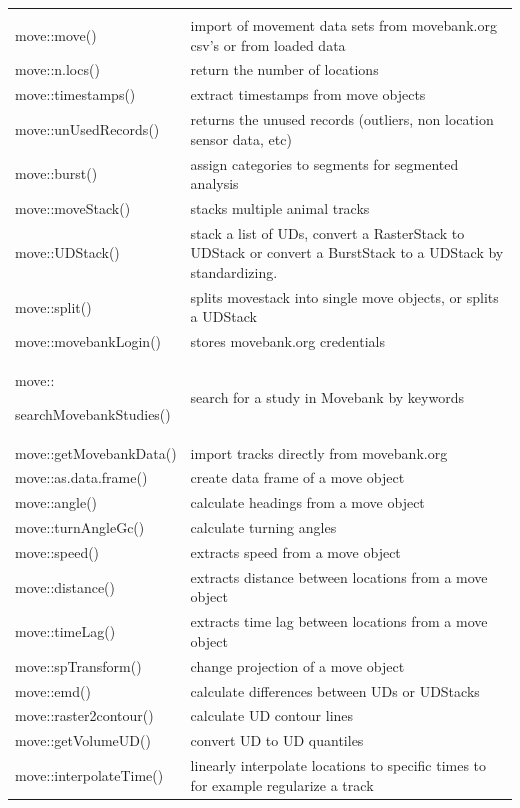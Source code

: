 \documentclass[a4paper,10pt,landscape]{article}
\begin{document}
\begin{multicols}{3}
\begin{tabular}{@{}p{\the\MyLen}%
                @{}p{\linewidth-\the\MyLen}@{}}
                & \\
move::move() & import of movement data sets from movebank.org csv's or from loaded data \\
move::n.locs() & return the number of locations \\
move::timestamps() & extract timestamps from move objects\\
move::unUsedRecords() &  returns the unused records (outliers, non location sensor data, etc)\\
move::burst() & assign categories to segments for segmented analysis \\
move::moveStack() & stacks multiple animal tracks \\
move::UDStack() & stack a list of UDs, convert a RasterStack to UDStack or convert a BurstStack to a UDStack by standardizing.\\
move::split() & splits movestack into single move objects, or splits a UDStack\\
move::movebankLogin() & stores movebank.org credentials \\
move::\par searchMovebankStudies() & search for a study in Movebank by keywords\\
move::getMovebankData() & import tracks directly from movebank.org \\
move::as.data.frame() & create data frame of a move object\\
move::angle() &  calculate headings from a move object\\
move::turnAngleGc() & calculate turning angles\\
move::speed() & extracts speed from a move object \\  
move::distance() & extracts distance between locations from a move object \\
move::timeLag() & extracts time lag between locations from a move object \\
move::spTransform() & change projection of a move object\\
move::emd() & calculate differences between UDs or UDStacks\\
move::raster2contour() & calculate UD contour lines \\
move::getVolumeUD() & convert UD to UD quantiles \\
move::interpolateTime() & linearly interpolate locations to specific times to for example regularize a track \\

\end{tabular}
\end{multicols}
\end{document}
